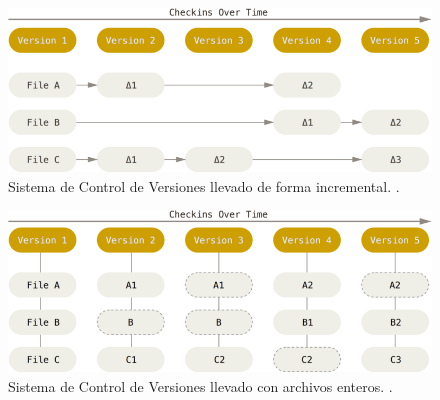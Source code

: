 \begin{figure}
  \begin{center}
      \includegraphics[width=\textwidth]{Figures/vcs-incremental.png}
  \end{center}
  \caption{Sistema de Control de Versiones  llevado de forma incremental. \citep{PROGIT-Git-Intro}.}
  \label{VCS-Incremental}
\end{figure}

\begin{figure}
  \begin{center}
      \includegraphics[width=\textwidth]{Figures/vcs-backup.png}
  \end{center}
  \caption{Sistema de Control de Versiones  llevado con archivos enteros. \citep{PROGIT-Git-Intro}.}
  \label{VCS-Backup}
\end{figure}

